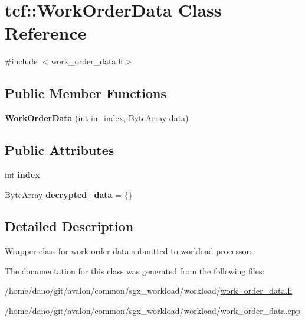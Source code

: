 \hypertarget{classtcf_1_1WorkOrderData}{}\section{tcf\+:\+:Work\+Order\+Data Class Reference}
\label{classtcf_1_1WorkOrderData}


{\ttfamily \#include $<$work\+\_\+order\+\_\+data.\+h$>$}

\subsection*{Public Member Functions}
\begin{DoxyCompactItemize}
\item 
\mbox{\label{classtcf_1_1WorkOrderData_adda73f15127fa666cf9108083c8067ac}} 
{\bfseries Work\+Order\+Data} (int in\+\_\+index, \hyperlink{types_8h_a35da937e2331acce98d47f44892f4a76}{Byte\+Array} data)
\end{DoxyCompactItemize}
\subsection*{Public Attributes}
\begin{DoxyCompactItemize}
\item 
\mbox{\label{classtcf_1_1WorkOrderData_aee832e4c55016de3a2e79d9adf2a52c2}} 
int {\bfseries index}
\item 
\mbox{\label{classtcf_1_1WorkOrderData_a3d99dcd6d7032b841fe8834bbefc26db}} 
\hyperlink{types_8h_a35da937e2331acce98d47f44892f4a76}{Byte\+Array} {\bfseries decrypted\+\_\+data} = \{\}
\end{DoxyCompactItemize}


\subsection{Detailed Description}
Wrapper class for work order data submitted to workload processors. 

The documentation for this class was generated from the following files\+:\begin{DoxyCompactItemize}
\item 
/home/dano/git/avalon/common/sgx\+\_\+workload/workload/\hyperlink{work__order__data_8h}{work\+\_\+order\+\_\+data.\+h}\item 
/home/dano/git/avalon/common/sgx\+\_\+workload/workload/work\+\_\+order\+\_\+data.\+cpp\end{DoxyCompactItemize}
